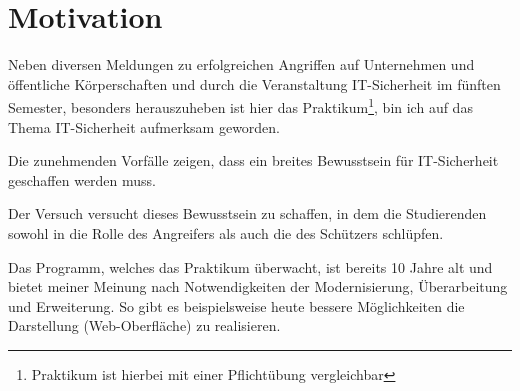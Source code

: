 \section{Motivation}
\label{sec:Motivation}
Neben diversen Meldungen zu erfolgreichen Angriffen auf Unternehmen und öffentliche Körperschaften und durch die Veranstaltung IT-Sicherheit im fünften Semester, besonders herauszuheben ist hier das Praktikum\footnote{Praktikum ist hierbei mit einer Pflichtübung vergleichbar}, bin ich auf das Thema IT-Sicherheit aufmerksam geworden. 

Die zunehmenden Vorfälle zeigen, dass ein breites Bewusstsein für IT-Sicherheit geschaffen werden muss.

Der Versuch  versucht dieses Bewusstsein zu schaffen, in dem die Studierenden sowohl in die Rolle des Angreifers als auch die des Schützers schlüpfen.

Das Programm, welches das Praktikum überwacht, ist bereits 10 Jahre alt und bietet meiner Meinung nach Notwendigkeiten der Modernisierung, Überarbeitung und Erweiterung. 
So gibt es beispielsweise heute bessere Möglichkeiten die Darstellung (Web-Oberfläche) zu realisieren.